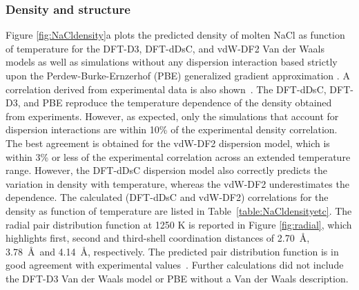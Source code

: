 \documentclass[preprint,3p,10pt,onecolumn,number,sort&compress]{elsarticle}
\begin{document}
{\subsubsection{Density and structure}
Figure \ref{fig:NaCldensity}a plots the predicted density of molten NaCl as function of temperature for the DFT-D3, DFT-dDsC, and vdW-DF2 Van der Waals models as well as simulations without any dispersion interaction based strictly upon the Perdew-Burke-Ernzerhof (PBE) generalized gradient approximation \cite{pbe}. A correlation derived from experimental data is also shown~\cite{Janz1988}. The DFT-dDsC, DFT-D3, and PBE reproduce the temperature dependence of the density obtained from experiments. However, as expected, only the simulations that account for dispersion interactions are within 10\% of the experimental density correlation. The best agreement is obtained for the vdW-DF2 dispersion model, which is within 3\% or less of the experimental correlation across an extended temperature range. However, the DFT-dDsC dispersion model also correctly predicts the variation in density with temperature, whereas the vdW-DF2 underestimates the dependence. The calculated (DFT-dDsC and vdW-DF2) correlations for the density as function of temperature are listed in Table~\ref{table:NaCldensityetc}. The radial pair distribution function at 1250 K is reported in Figure \ref{fig:radial}, which highlights first, second and third-shell coordination distances of 2.70~\AA, 3.78~\AA~and 4.14~\AA, respectively. The predicted pair distribution function is in good agreement with experimental values~\cite{Edwards_1975}. Further calculations did not include the DFT-D3 Van der Waals model or PBE without a Van der Waals description.


}
\end{document}
